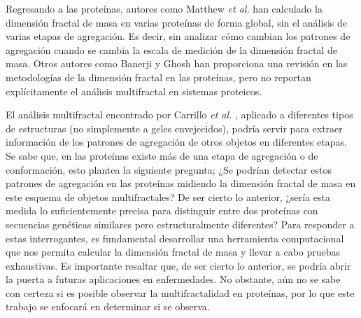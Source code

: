 Regresando a las prote\'{i}nas, autores como Matthew \textit{et al.} \cite{Enright2005} han calculado la dimensi\'{o}n fractal de masa en varias prote\'{i}nas de forma global, sin el an\'{a}lisis de varias etapas de agregaci\'{o}n. Es decir, sin analizar c\'{o}mo cambian los patrones de agregaci\'{o}n cuando se cambia la escala de medici\'{o}n de la dimensi\'{o}n fractal de masa. Otros autores como Banerji y Ghosh \cite{Banerji2011} han proporciona una revisión en las metodologías de la dimensión fractal en las proteínas, pero no reportan explícitamente el análisis multifractal en sistemas proteicos. 

El an\'{a}lisis multifractal encontrado por Carrillo \textit{et al.} \cite{Carrillo2003}, aplicado a diferentes tipos de estructuras (no simplemente a geles envejecidos), podr\'{i}a servir para extraer informaci\'{o}n de los patrones de agregaci\'{o}n de otros objetos en diferentes etapas. Se sabe que, en las prote\'{i}nas existe m\'{a}s de una etapa de agregaci\'{o}n o de conformaci\'{o}n, esto plantea la siguiente pregunta; ¿Se podr\'{i}an detectar estos patrones de agregaci\'{o}n en las prote\'{i}nas midiendo la dimensi\'{o}n fractal de masa en este esquema de objetos multifractales? De ser cierto lo anterior, ¿ser\'{i}a esta medida lo suficientemente precisa para distinguir entre dos prote\'{i}nas con secuencias gen\'{e}ticas similares pero estructuralmente diferentes? Para responder a estas interrogantes, es fundamental desarrollar una herramienta computacional que nos permita calcular la dimensi\'{o}n fractal de masa y llevar a cabo pruebas exhaustivas. Es importante resaltar que, de ser cierto lo anterior, se podr\'{i}a abrir la puerta a futuras aplicaciones en enfermedades. No obstante, a\'{u}n no se sabe con certeza si es posible observar la multifractalidad en prote\'{i}nas, por lo que este trabajo se enfocar\'{a} en determinar si se observa.

















